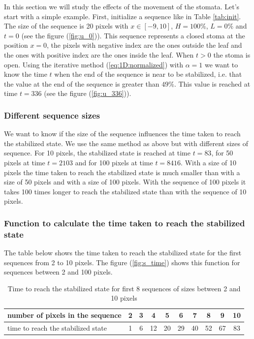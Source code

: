 In this section we will study the effects of the movement of the stomata. Let's start 
with a simple example. First, initialize a sequence like in Table \ref{tab:init}. The size 
of the sequence is 20 pixels with $x \in [-9,10]$, $H=100\%$, $L=0\%$ and $t=0$ (see the 
figure (\ref{fig:u_0})). This sequence represents a closed stoma at the position $x=0$, 
the pixels with negative index are the ones outside the leaf and the ones with positive 
index are the ones inside the leaf. When $t>0$ the stoma is open. Using the iterative 
method (\ref{eq:1D:normalized}) with $\alpha = 1$ we want to know the time $t$ when the 
end of the sequence is near to be stabilized, i.e. that the value at the end of the 
sequence is greater than $49\%$. This value is reached at time $t=336$ (see the figure 
(\ref{fig:u_336})).

\subsubsection{Different sequence sizes}

We want to know if the size of the sequence influences the time taken to reach the
stabilized state. We use the same method as above but with different sizes of sequence.
For 10 pixels, the stabilized state is reached at time $t=83$, for 50 pixels at time 
$t=2103$ and for 100 pixels at time $t=8416$. With a size of 10 pixels the time taken to 
reach the stabilized state is much smaller than with a size of 50 pixels and with a size 
of 100 pixels. With the sequence of 100 pixels it takes 100 times longer to reach the 
stabilized state than with the sequence of 10 pixels.

\subsubsection{Function to calculate the time taken to reach the stabilized state}

The table below shows the time taken to reach the stabilized state for the first 
sequences from 2 to 10 pixels. The figure (\ref{fig:s_time}) shows this function
for sequences between 2 and 100 pixels.

\begin{table}[ht]
    \centering
    \begin{tabular}{|l|c|c|c|c|c|c|c|c|c|} \hline
        number of pixels in the sequence   & 2 & 3 & 4 & 5 & 6 & 7 & 8 & 9 & 10 \\\hline
        time to reach the stabilized state & 1 & 6 & 12 & 20 & 29 & 40 & 52 & 67 & 83 \\\hline
    \end{tabular}
    \caption{Time to reach the stabilized state for first 8 sequences of sizes between 2 and 10 pixels}
    \label{tab:s_time}
\end{table}

